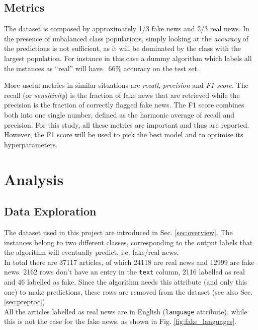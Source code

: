 \documentclass[a4paper,12pt]{article} %
\begin{document}
\subsection{Metrics}
\label{sec:metrics}
The dataset is composed by approximately 1/3 fake news and 2/3 real news.
In the presence of unbalanced class populations, simply looking at
the \textit{accuracy} of the predictions is not sufficient, as it will be
dominated by the class with the largest population.
For instance in this case a dummy algorithm which labels all the
instances as ``real'' will have ~66\% accuracy on the test set.

More useful metrics in similar situations are \textit{recall}, \textit{precision} and \textit{F1 score}.
The recall (or \textit{sensitivity}) \cite{wiki_recall_precision} is the fraction
of fake news that are retrieved while the precision is the fraction of correctly flagged fake news.
The F1 score \cite{wiki_f1score} combines both into one single number, defined as the harmonic average
of recall and precision.
For this study, all these metrics are important and thus are reported.
However, the F1 score will be used to pick the best model and to optimise its hyperparameters.


\section{Analysis}

\subsection{Data Exploration}
\label{sec:explore}
The dataset used in this project are introduced in Sec. \ref{sec:overview}.
The instances belong to two different classes, corresponding to the output labels
that the algorithm will eventually predict, i.e. fake/real news. \\
In total there are 37117 articles, of which 24118 are real news and 12999 are fake news.
2162 rows don't have an entry in the \texttt{text} column, 2116 labelled as real and
46 labelled as fake.
Since the algorithm needs this attribute (and only this one) to make predictions,
these rows are removed from the dataset (see also Sec. \ref{sec:preproc}). \\
All the articles labelled as real news are in English (\texttt{language} attribute),
while this is not the case for the fake news, as shown in Fig. \ref{fig:fake_languages}.
\end{document}
